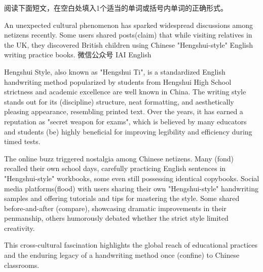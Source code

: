 \documentclass{英语试卷}
\begin{document}
\par 阅读下面短文，在空白处填入1个适当的单词或括号内单词的正确形式。\par
\par An unexpected cultural phenomenon has sparked widespread discussions among netizens recently. Some users shared posts(claim) that while visiting relatives in the UK, they discovered British children using Chinese "Hengshui-style" English writing practice books. 微信公众号 IAI English\par
\par Hengshui Style, also known as "Hengshui Ti", is a standardized English handwriting method popularized by students from Hengshui High School \blanknum{} strictness and academic excellence are well known in China. The writing style stands out for its \blanknum{} (discipline) structure, neat formatting, and aesthetically pleasing appearance, resembling printed text. Over the years, it has earned a reputation as \blanknum{} "secret weapon for exams", which is believed by many educators and students \blanknum{} (be) highly beneficial for improving legibility and efficiency during timed tests.\par
\par The online buzz triggered nostalgia among Chinese netizens. Many (fond) recalled their own school days, carefully practicing English sentences in "Hengshui-style" workbooks, some even still possessing identical copybooks. Social media platforms(flood) with users sharing their own "Hengshui-style" handwriting samples and offering tutorials and tips for mastering the style. Some shared before-and-after (compare), showcasing dramatic improvements in their penmanship,  others humorously debated whether the strict style limited creativity.\par
\par This cross-cultural fascination highlights the global reach of educational practices and the enduring legacy of a handwriting method once  (confine) to Chinese classrooms.\par
{}
\end{document}
